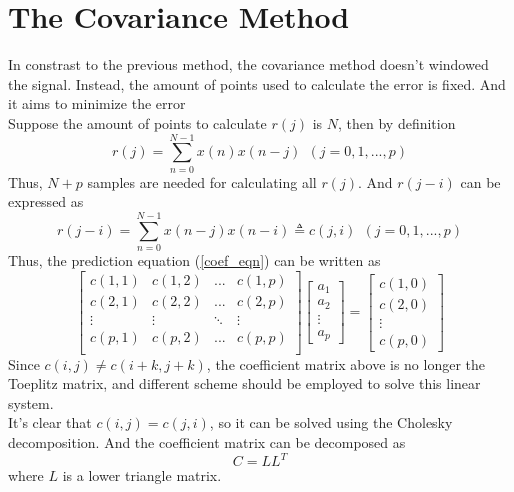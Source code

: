 \documentclass[preprint,12pt]{elsarticle}
\begin{document}
\section{The Covariance Method}
In constrast to the previous method, the covariance method doesn't windowed the signal. Instead, the amount of points used to calculate the error is fixed. And it aims to minimize the error\\
Suppose the amount of points to calculate $r(j)$ is $N$, then by definition
\begin{equation}
	r(j) = \sum_{n=0}^{N-1}x(n)x(n-j) \ \ (j = 0, 1, ... , p)
\end{equation}
Thus, $N+p$ samples are needed for calculating all $r(j)$. And $r(j-i)$ can be expressed as 
\begin{equation}
	r(j-i) = \sum_{n=0}^{N-1} x(n-j)x(n-i) \triangleq c(j, i) \ \ (j = 0, 1, ... , p) 
\end{equation}
Thus, the prediction equation (\ref{coef_eqn}) can be written as
\begin{equation}
	\begin{bmatrix}
		c(1, 1) & c(1, 2) & ... & c(1, p)\\
		c(2, 1) & c(2, 2) & ... & c(2, p)\\
		\vdots  & \vdots  & \ddots & \vdots\\
		c(p, 1) & c(p, 2) & ... & c(p, p)\\
	\end{bmatrix}
	\begin{bmatrix}
		a_1 \\ a_2 \\ \vdots \\ a_p
	\end{bmatrix}
	=
	\begin{bmatrix}
		c(1, 0) \\ c(2, 0) \\ \vdots \\ c(p, 0)
	\end{bmatrix}
\end{equation}
Since $c(i, j) \neq c(i+k, j+k)$, the coefficient matrix above is no longer the Toeplitz matrix, and different scheme should be employed to solve this linear system.\\
It's clear that $c(i, j) = c(j, i)$, so it can be solved using the Cholesky decomposition. And the coefficient matrix can be decomposed as
\begin{equation}
	C = L L^T
\end{equation}
where $L$ is a lower triangle matrix.
\end{document}
